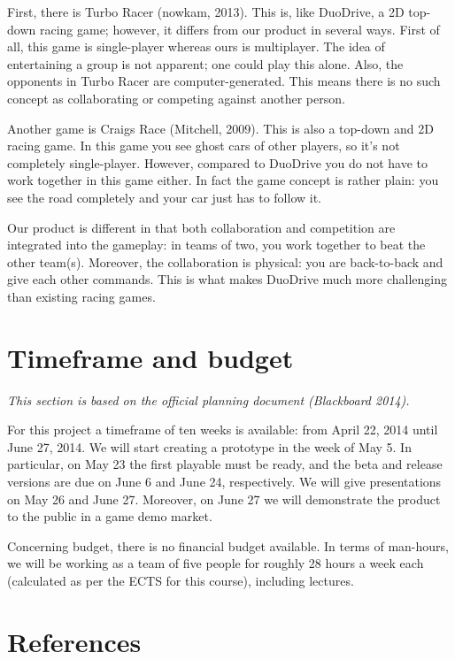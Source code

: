 \documentclass[11pt,twoside,a4paper]{article}
\begin{document}
First, there is Turbo Racer (nowkam, 2013). This is, like DuoDrive, a 2D top-down racing game; however, it differs from our product in several ways. First of all, this game is single-player whereas ours is multiplayer. The idea of entertaining a group is not apparent; one could play this alone. Also, the opponents in Turbo Racer are computer-generated. This means there is no such concept as collaborating or competing against another person.

Another game is Craigs Race (Mitchell, 2009). This is also a top-down and 2D racing game. In this game you see ghost cars of other players, so it's not completely single-player. However, compared to DuoDrive you do not have to work together in this game either. In fact the game concept is rather plain: you see the road completely and your car just has to follow it.

Our product is different in that both collaboration and competition are integrated into the gameplay: in teams of two, you work together to beat the other team(s). Moreover, the collaboration is physical: you are back-to-back and give each other commands. This is what makes DuoDrive much more challenging than existing racing games.


\section{Timeframe and budget}
{\itshape This section is based on the official planning document (Blackboard 2014).}

For this project a timeframe of ten weeks is available: from April 22, 2014 until June 27, 2014. We will start creating a prototype in the week of May 5. In particular, on May 23 the first playable must be ready, and the beta and release versions are due on June 6 and June 24, respectively. We will give presentations on May 26 and June 27. Moreover, on June 27 we will demonstrate the product to the public in a game demo market.

Concerning budget, there is no financial budget available. In terms of man-hours, we will be working as a team of five people for roughly 28 hours a week each (calculated as per the ECTS for this course), including lectures.


\clearpage

\section*{References}
\end{document}

